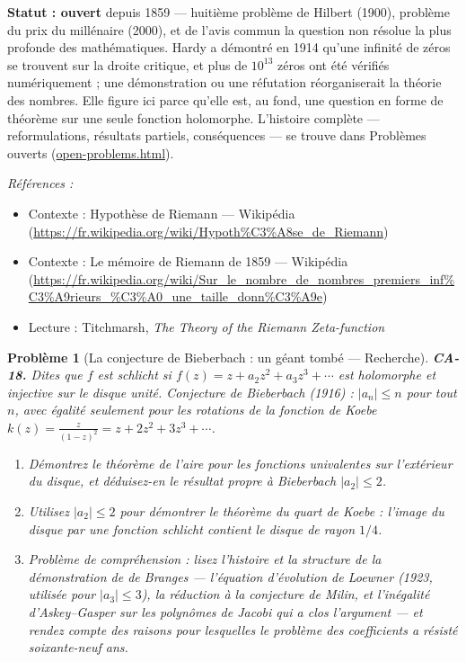 \documentclass[11pt]{article}
\newtheorem{problem}{Problème}
\newenvironment{refs}{\par\small\noindent\emph{Références :}\begin{itemize}\setlength\itemsep{0pt}}{\end{itemize}\normalsize}
\begin{document}
\noindent \textbf{Statut : ouvert} depuis 1859 --- huitième problème de Hilbert (1900),
problème du prix du millénaire (2000), et de l'avis commun la question non résolue la plus profonde
des mathématiques. Hardy a démontré en 1914 qu'une infinité de zéros se trouvent sur la droite
critique, et plus de $ 10^{13} $ zéros ont été vérifiés numériquement ; une démonstration ou une
réfutation réorganiserait la théorie des nombres. Elle figure ici parce qu'elle est, au fond, une
question en forme de théorème sur une seule fonction holomorphe. L'histoire complète ---
reformulations, résultats partiels, conséquences --- se trouve dans
Problèmes ouverts (\url{open-problems.html}).

\begin{refs}
\item Contexte : Hypothèse de Riemann --- Wikipédia (\url{https://fr.wikipedia.org/wiki/Hypoth%C3%A8se_de_Riemann})
\item Contexte : Le mémoire de Riemann de 1859 --- Wikipédia (\url{https://fr.wikipedia.org/wiki/Sur_le_nombre_de_nombres_premiers_inf%C3%A9rieurs_%C3%A0_une_taille_donn%C3%A9e})
\item Lecture : Titchmarsh, \textit{The Theory of the Riemann Zeta-function}
\end{refs}

\bigskip

\begin{problem}[{La conjecture de Bieberbach : un géant tombé --- Recherche}]
\textbf{CA-18.} Dites que $ f $ est \textit{schlicht} si
$ f(z) = z + a_2 z^2 + a_3 z^3 + \cdots $ est holomorphe et injective sur le disque unité.
Conjecture de Bieberbach (1916) : $ |a_n| \le n $ pour tout $ n $, avec égalité seulement pour
les rotations de la fonction de Koebe
$ k(z) = \frac{z}{(1 - z)^2} = z + 2z^2 + 3z^3 + \cdots $.
\begin{enumerate}
\item[(a)] Démontrez le théorème de l'aire pour les fonctions univalentes sur l'extérieur du disque, et
déduisez-en le résultat propre à Bieberbach $ |a_2| \le 2 $.
\item[(b)] Utilisez $ |a_2| \le 2 $ pour démontrer le théorème du quart
de Koebe : l'image du disque par une fonction schlicht contient le disque de rayon
$ 1/4 $.
\item[(c)] Problème de compréhension : lisez l'histoire et la structure de la démonstration
de de Branges --- l'équation d'évolution de Loewner (1923, utilisée pour $ |a_3| \le 3 $), la
réduction à la conjecture de Milin, et l'inégalité d'Askey--Gasper sur les polynômes de Jacobi qui a
clos l'argument --- et rendez compte des raisons pour lesquelles le problème des coefficients a
résisté soixante-neuf ans.
\end{enumerate}

\end{problem}
\end{document}
